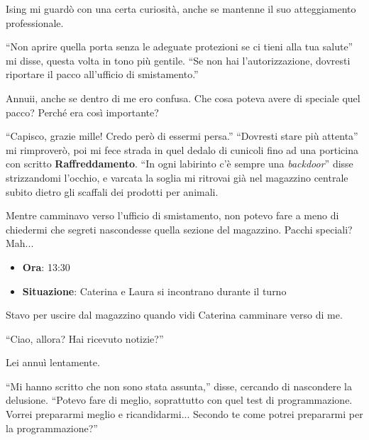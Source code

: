  Ising mi guardò con una certa curiosità, anche se mantenne il suo atteggiamento professionale.
\begin{dialogue}
 \enquote{Non aprire quella porta senza le adeguate protezioni  se ci tieni alla tua salute} mi disse, questa volta in tono più gentile. \enquote{Se non hai l’autorizzazione, dovresti riportare il pacco all'ufficio di smistamento.}
\end{dialogue}
 Annuii, anche se dentro di me ero confusa. Che cosa poteva avere di speciale quel pacco? Perché era così importante?
\begin{dialogue}
 \enquote{Capisco, grazie mille! Credo però di essermi persa.}
 \enquote{Dovresti stare più attenta} mi rimproverò, poi mi fece strada in quel dedalo di cunicoli fino ad una porticina con scritto \textbf{Raffreddamento}. \enquote{In ogni labirinto c'è sempre una \textit{backdoor}} disse strizzandomi l'occhio, e varcata la soglia mi ritrovai già nel magazzino centrale subito dietro gli scaffali dei prodotti per animali.
\end{dialogue}
 

Mentre camminavo verso l'ufficio di smistamento, non potevo fare a meno di chiedermi che segreti nascondesse quella sezione del magazzino. Pacchi speciali? Mah...

\begin{tcolorbox}[colback=gray!1,colframe=gray!30,title=\textbf{Scheda Informativa}]
\begin{itemize}
\item \textbf{Ora}: 13:30
  \item \textbf{Situazione}: Caterina e Laura si incontrano durante il turno
\end{itemize}
\end{tcolorbox}

Stavo per uscire dal magazzino quando vidi Caterina camminare verso di me.

\begin{dialogue}
 \enquote{Ciao, allora? Hai ricevuto notizie?}
\end{dialogue}

Lei annuì lentamente.

\begin{dialogue}
 \enquote{Mi hanno scritto che non sono stata assunta,} disse, cercando di nascondere la delusione. \enquote{Potevo fare di meglio, soprattutto con quel test di programmazione. Vorrei prepararmi meglio e ricandidarmi... Secondo te come potrei prepararmi per la programmazione?}
\end{dialogue}

